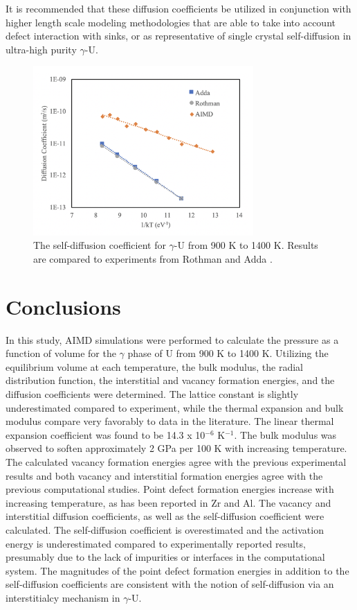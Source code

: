 \documentclass[review]{elsarticle}
\begin{document}
It is recommended that these diffusion coefficients be utilized in conjunction with higher length scale modeling methodologies that are able to take into account defect interaction with sinks, or as representative of single crystal self-diffusion in ultra-high purity $\gamma$-U.

 \begin{figure}[h]
 \centering
 \includegraphics[width=0.75\textwidth]{9_self_diff.png} 
 \caption{The self-diffusion coefficient for $\gamma$-U from 900 K to 1400 K. Results are compared to experiments from Rothman \cite{rothman1959} and Adda \cite{adda1959}. }
 \label{fig:selfdiff}
\end{figure}

\FloatBarrier

\section{Conclusions}

In this study, AIMD simulations were performed to calculate the pressure as a function of volume for the $\gamma$ phase of U from 900 K to 1400 K. Utilizing the equilibrium volume at each temperature, the bulk modulus, the radial distribution function, the interstitial and vacancy formation energies, and the diffusion coefficients were determined. The lattice constant is slightly underestimated compared to experiment, while the thermal expansion and bulk modulus compare very favorably to data in the literature. The linear thermal expansion coefficient was found to be 14.3 x 10$^{-6}$ K$^{-1}$. The bulk modulus was observed to soften approximately 2 GPa per 100 K with increasing temperature. The calculated vacancy formation energies agree with the previous experimental results and both vacancy and interstitial formation energies agree with the previous computational studies. Point defect formation energies increase with increasing temperature, as has been reported in Zr and Al. The vacancy and interstitial diffusion coefficients, as well as the self-diffusion coefficient were calculated. The self-diffusion coefficient is overestimated and the activation energy is underestimated compared to experimentally reported results, presumably due to the lack of impurities or interfaces in the computational system. The magnitudes of the point defect formation energies in addition to the self-diffusion coefficients are consistent with the notion of self-diffusion via an interstitialcy mechanism in $\gamma$-U. 
\end{document}
